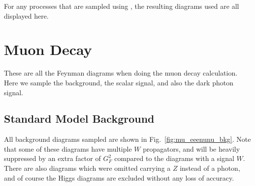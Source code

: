 \label{app:madgraph_diagrams}
For any processes that are sampled using \madgraph, the resulting diagrams used are all displayed here.

\section{Muon Decay}
\label{app:muon_diagrams}
These are all the Feynman diagrams when doing the muon decay calculation.
Here we sample the background, the scalar signal, and also the dark photon signal.

\subsection{Standard Model Background}
All background diagrams sampled are shown in Fig.\ \ref{fig:mu_eeenunu_bkg}. 
Note that some of these diagrams have multiple $W$ propagators, and will be heavily suppressed by an extra factor of $G_F^2$ compared to the diagrams with a signal $W$.
There are also diagrams which were omitted carrying a $Z$ instead of a photon, and of course the Higgs diagrams are excluded without any loss of accuracy.

